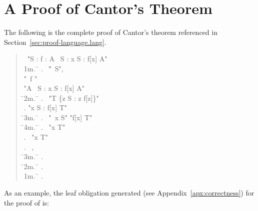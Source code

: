 \documentclass[a4paper]{easychair}
\begin{document}
\clearpage

\section{A \tlatwo Proof of Cantor's Theorem}
\label{apx:cantor}

The following is the complete \tlatwo proof of Cantor's theorem
referenced in Section~\ref{sec:proof-language.lang}.
\begin{quote} \small
  \begin{tabbing}
    \THEOREM\ "\forall S : \forall f \in [S -> \SUBSET\ S] : \exists A \in \SUBSET\ S : \forall x \in S : f[x] \neq A" \\
    \s1m.\ \= \kill
    .\ \> \ASSUME \= "\NEW\ S", \\
           \>         \> "\NEW\ f \in [S -> \SUBSET\ S]" \\
           \> \PROVE "\exists A \in \SUBSET\ S : \forall x \in S : f[x] \neq A" \\
           \hspace{1em}\= \s2m.\ \= \kill
\> .\ \> \DEFINE "T \DEF \{z \in S : z \notin f[z]\}" \\
           \> .  \> "\forall x \in S : f[x] \neq T" \\
           \>        \hspace{1em}\= \s3m.\ \= \kill
\>        \> .\ \> \ASSUME "\NEW\ x \in S" \PROVE "f[x] \neq T" \\
           \>        \>        \hspace{1em}\=\s4m.\ \= \kill
           \>        \>        \> .\ \> \CASE "x \in T" \OBVIOUS \\
           \>        \>        \> .\ \> \CASE "x \notin T" \OBVIOUS \\
           \>        \>        \> .\ \> \QED \BY {},  \\
           \>        \hspace{1em}\= \s3m.\ \= \kill
           \>        \> .  \> \QED\ \BY\  \\
           \hspace{1em}\= \s2m.\ \= \kill
           \> .  \> \QED\ \BY\  \\
    \s1m.\ \= \kill
    .  \> \QED\ \BY\ 
  \end{tabbing}
\end{quote}
As an example, the leaf obligation generated (see
Appendix~\ref{apx:correctness}) for the proof of  is:
\def\ss#1#2{\hbox{\s{#1}{#2}}}
\end{document}
